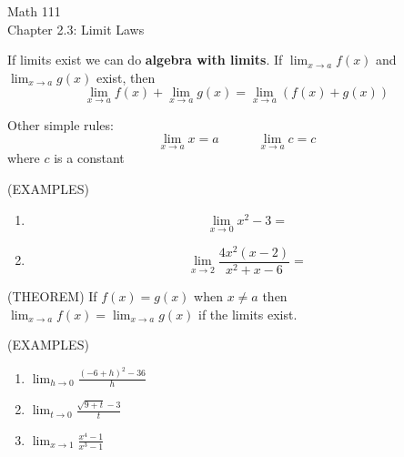 \documentclass[11pt]{article}
\begin{document}
\begin{center}
\Large
\rm{Math 111}
\\
\rm{Chapter 2.3:  Limit Laws}
\\
\end{center}
\vspace{0.2in}

If limits exist we can do {\bf algebra with limits}.  If $\lim_{x\to a}f(x)$ and $\lim_{x\to a}g(x)$ exist, then
\begin{displaymath}
  \lim_{x\to a}f(x) + \lim_{x\to a}g(x) =  \lim_{x\to a}(f(x) + g(x))
  \end{displaymath}

\vspace{2.5in}


Other simple rules:
\begin{displaymath}
  \lim_{x\to a}x = a \quad\quad\quad   \lim_{x\to a}c = c   
  \end{displaymath}
where $c$ is a constant\\

\vspace{.5in}

(EXAMPLES)

\begin{enumerate}
  \item{
\begin{displaymath}
  \lim_{x\to 0} x^2-3 = 
  \end{displaymath}

\vspace{.5in}

}

    \vspace{1.0in}


          \item{
\begin{displaymath}
  \lim_{x\to 2} \frac{4x^2(x-2)}{x^2+x-6} = 
  \end{displaymath}

\vspace{1.5in}

  }


  \end{enumerate}

\pagebreak

(THEOREM) If $f(x)=g(x)$ when $x\neq a$ then $\lim_{x\to a}f(x)  = \lim_{x\to a}g(x) $ if the limits exist. \\

\vspace{.5in}

(EXAMPLES)
\begin{enumerate}
\item{$\lim_{h \to 0}\frac{(-6+h)^2-36}{h}$}

  \vspace{2in}
  
\item{$\lim_{t \to 0}\frac{\sqrt{9+t}-3}{t}$}

  \vspace{2in}
  
\item{$\lim_{x\to 1}\frac{x^4-1}{x^3-1}$}


  \end{enumerate}

\pagebreak
\end{document}
